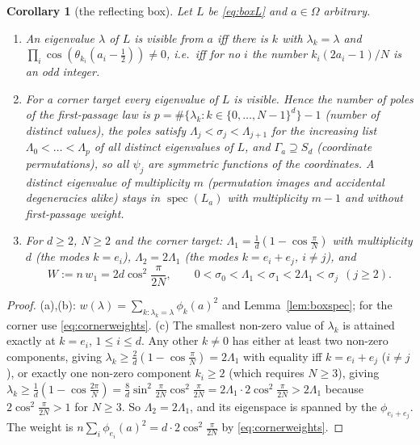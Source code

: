 \documentclass[11pt,a4paper]{article}
\DeclareMathOperator{\spec}{spec}
\theoremstyle{plain}
\newtheorem{corollary}[theorem]{Corollary}
\theoremstyle{definition}
\numberwithin{equation}{section}
\begin{document}
\begin{corollary}[the reflecting box]\label{cor:box}
Let $L$ be \eqref{eq:boxL} and $a\in\Omega$ arbitrary.
\begin{enumerate}
\item[(a)] An eigenvalue $\lambda$ of $L$ is visible from $a$ iff there is $k$ with $\lambda_k=\lambda$ and $\prod_i\cos(\theta_{k_i}(a_i-\frac12))\ne0$, i.e.\ iff for no $i$ the number $k_i(2a_i-1)/N$ is an odd integer.
\item[(b)] For a corner target every eigenvalue of $L$ is visible. Hence the number of poles of the first-passage law is $p=\#\{\lambda_k:k\in\{0,\dots,N-1\}^d\}-1$ (number of distinct values), the poles satisfy
$\Lambda_j<\sigma_j<\Lambda_{j+1}$ for the increasing list $\Lambda_0<\dots<\Lambda_p$ of \emph{all} distinct eigenvalues of $L$, and $\Gamma_a\supseteq S_d$ (coordinate permutations), so all $\psi_j$ are symmetric functions of the coordinates. A distinct eigenvalue of multiplicity $m$ (permutation images and accidental degeneracies alike) stays in $\spec(L_a)$ with multiplicity $m-1$ and without first-passage weight.
\item[(c)] For $d\ge 2$, $N\ge2$ and the corner target: $\Lambda_1=\frac1d(1-\cos\frac\pi N)$ with multiplicity $d$ (the modes $k=e_i$), $\Lambda_2=2\Lambda_1$ (the modes $k=e_i+e_j$, $i\ne j$), and
\begin{equation}\label{eq:W}
W:=n\,w_1=2d\cos^2\frac{\pi}{2N},\qquad
0<\sigma_0<\Lambda_1<\sigma_1<2\Lambda_1<\sigma_j\ \ (j\ge2) .
\end{equation}
\end{enumerate}
\end{corollary}
\begin{proof}
(a),(b): $w(\lambda)=\sum_{k:\lambda_k=\lambda}\phi_k(a)^2$ and Lemma~\ref{lem:boxspec}; for the corner use \eqref{eq:cornerweights}.
(c) The smallest non-zero value of $\lambda_k$ is attained exactly at $k=e_i$, $1\le i\le d$. Any other $k\ne0$ has either at least two non-zero components, giving $\lambda_k\ge\frac2d(1-\cos\frac\pi N)=2\Lambda_1$ with equality iff $k=e_i+e_j$ ($i\ne j$), or exactly one non-zero component $k_i\ge2$ (which requires $N\ge3$), giving
$\lambda_k\ge\frac1d(1-\cos\frac{2\pi}N)=\frac8d\sin^2\frac\pi{2N}\cos^2\frac\pi{2N}=2\Lambda_1\cdot2\cos^2\frac{\pi}{2N}>2\Lambda_1$ because $2\cos^2\frac\pi{2N}>1$ for $N\ge3$. So $\Lambda_2=2\Lambda_1$, and its eigenspace is spanned by the $\phi_{e_i+e_j}$. The weight is $n\sum_i\phi_{e_i}(a)^2=d\cdot2\cos^2\frac\pi{2N}$ by \eqref{eq:cornerweights}.
\end{proof}
\end{document}
